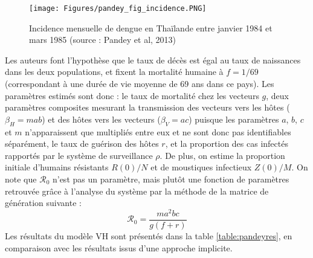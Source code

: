 

\begin{figure}[t]
	\centering
	\texttt{[image: Figures/pandey\_fig\_incidence.PNG]}
	\caption{Incidence mensuelle de dengue en Thaïlande entre janvier 1984 et mars 1985 (source : Pandey et al, 2013)}
	\label{fig:pandey_figure_incidence}
\end{figure}


Les auteurs font l'hypothèse que le taux de décès est égal au taux de naissances dans les deux populations, et fixent la mortalité humaine à $f=1/69$ (correspondant à une durée de vie moyenne de 69 ans dans ce pays).
Les paramètres estimés sont donc : le taux de mortalité chez les vecteurs $g$, deux paramètres composites mesurant la transmission des vecteurs vers les hôtes ($\beta_H=mab$) et des hôtes vers les vecteurs ($\beta_V=ac$) puisque les paramètres $a$, $b$, $c$ et $m$ n'apparaissent que multipliés entre eux et ne sont donc pas identifiables séparément, le taux de guérison des hôtes $r$, et la proportion des cas infectés rapportés par le système de surveillance $\rho$.
De plus, on estime la proportion initiale d'humains résistants $R(0)/N$ et de moustiques infectieux $Z(0)/M$.
On note que $\mathcal{R}_0$ n'est pas un paramètre, mais plutôt une fonction de paramètres retrouvée grâce à l'analyse du système par la méthode de la matrice de génération suivante :
\begin{equation}
\mathcal{R}_0 = \frac{ma^2bc}{g(f+r)}
\end{equation}
Les résultats du modèle VH sont présentés dans la table \ref{table:pandeyres}, en comparaison avec les résultats issus d'une approche implicite.

